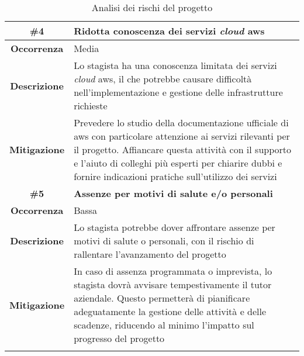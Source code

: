 \begin{longtable}{|c|>{\centering\arraybackslash}p{}|}
    \rowcolor{green!30} %
    \textbf{\#4} & \textbf{Ridotta conoscenza dei servizi \textit{cloud} \gls{aws}} \\
    \hline
    \textbf{Occorrenza} & Media \\
    \hline
    \textbf{Descrizione} & Lo stagista ha una conoscenza limitata dei servizi \textit{cloud} \gls{aws}, il che potrebbe causare difficoltà nell’implementazione e gestione delle infrastrutture richieste\\
    \hline
    \textbf{Mitigazione} & Prevedere lo studio della documentazione ufficiale di \gls{aws} con particolare attenzione ai servizi rilevanti per il progetto. Affiancare questa attività con il supporto e l’aiuto di colleghi più esperti per chiarire dubbi e fornire indicazioni pratiche sull’utilizzo dei servizi\\
    \hline
    
    \rowcolor{green!30} %
    \textbf{\#5} & \textbf{Assenze per motivi di salute e/o personali} \\
    \hline
    \textbf{Occorrenza} & Bassa \\
    \hline
    \textbf{Descrizione} &  Lo stagista potrebbe dover affrontare assenze per motivi di salute o personali, con il rischio di rallentare l'avanzamento del progetto\\
    \hline
    \textbf{Mitigazione} &In caso di assenza programmata o imprevista, lo stagista dovrà avvisare tempestivamente il tutor aziendale. Questo permetterà di pianificare adeguatamente la gestione delle attività e delle scadenze, riducendo al minimo l'impatto sul progresso del progetto\\
    \hline

    \caption{Analisi dei rischi del progetto} %
    \label{tab:analisi-rischi} %
\end{longtable}